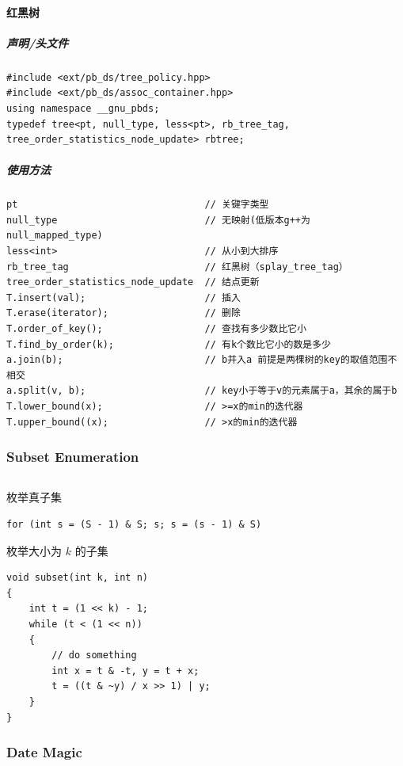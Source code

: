 \documentclass[twoside]{article}
\begin{document}
\paragraph{红黑树}
\subparagraph{声明/头文件}
\begin{lstlisting}
#include <ext/pb_ds/tree_policy.hpp>
#include <ext/pb_ds/assoc_container.hpp>
using namespace __gnu_pbds;
typedef tree<pt, null_type, less<pt>, rb_tree_tag, tree_order_statistics_node_update> rbtree;
\end{lstlisting}
\subparagraph{使用方法}
\begin{lstlisting}
pt                                 // 关键字类型
null_type                          // 无映射(低版本g++为null_mapped_type)
less<int>                          // 从小到大排序
rb_tree_tag                        // 红黑树（splay_tree_tag）
tree_order_statistics_node_update  // 结点更新
T.insert(val);                     // 插入
T.erase(iterator);                 // 删除
T.order_of_key();                  // 查找有多少数比它小
T.find_by_order(k);                // 有k个数比它小的数是多少
a.join(b);                         // b并入a 前提是两棵树的key的取值范围不相交
a.split(v, b);                     // key小于等于v的元素属于a，其余的属于b
T.lower_bound(x);                  // >=x的min的迭代器
T.upper_bound((x);                 // >x的min的迭代器
\end{lstlisting}
\subsubsection{Subset Enumeration}
\begin{lstlisting}
\end{lstlisting}
枚举真子集
\begin{lstlisting}
for (int s = (S - 1) & S; s; s = (s - 1) & S)
\end{lstlisting}
枚举大小为 $k$ 的子集
\begin{lstlisting}
void subset(int k, int n)
{
    int t = (1 << k) - 1;
    while (t < (1 << n))
    {
        // do something
        int x = t & -t, y = t + x;
        t = ((t & ~y) / x >> 1) | y;
    }
}
\end{lstlisting}

\subsubsection{Date Magic}
\end{document}
